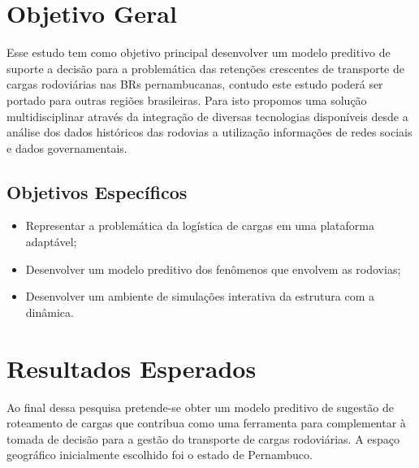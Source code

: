 \pagebreak

\section{ Objetivo Geral}\label{intro:objetivo}

Esse estudo tem como objetivo principal desenvolver um modelo preditivo de suporte a decisão para a problemática das retenções crescentes de transporte de cargas rodoviárias 
nas BRs pernambucanas, contudo este estudo poderá ser portado para outras regiões brasileiras. 
Para isto propomos uma solução multidisciplinar através da integração de diversas tecnologias disponíveis desde a análise dos dados históricos das 
rodovias a utilização informações de redes sociais e dados governamentais.

\subsection{ Objetivos Específicos}\label{intro:especificos}

\begin{itemize}
 \item Representar a problemática da logística de cargas em uma plataforma adaptável;
 \item Desenvolver um modelo preditivo dos fenômenos que envolvem as rodovias;
 \item Desenvolver um ambiente de simulações interativa da estrutura com a dinâmica.
\end{itemize}


\section{ Resultados Esperados}\label{resultado}

Ao final dessa pesquisa pretende-se obter um modelo preditivo de sugestão de roteamento de cargas
que contribua como uma ferramenta para complementar à tomada de decisão para a gestão do transporte 
de cargas rodoviárias.
A espaço geográfico inicialmente escolhido foi o estado de Pernambuco.








